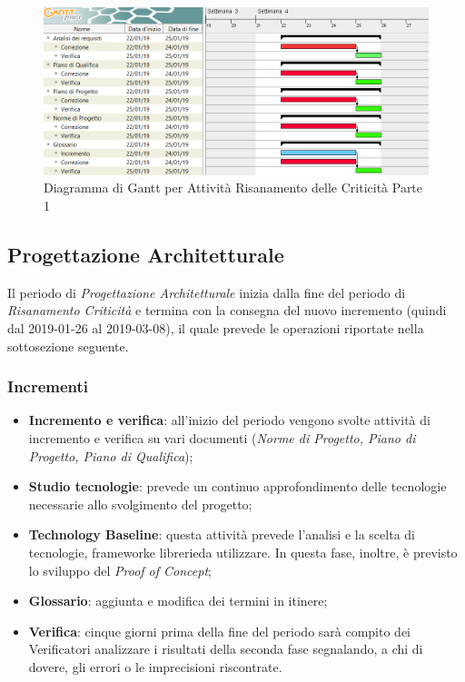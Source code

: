 \begin{figure}[h]
	\centering
  		\includegraphics[width=1.0\linewidth]{./images/RisanamentoCriticita1.png}
  		\caption{Diagramma di Gantt per Attività Risanamento delle Criticità Parte 1}
  		\label{fig:Gantt Risananmento Criticità 1}
\end{figure}

\newpage
\subsection{Progettazione Architetturale}
\label{PA}

Il periodo di \textit{Progettazione Architetturale} inizia dalla fine del periodo di \textit{Risanamento Criticità} e termina con la consegna del nuovo incremento (quindi dal 2019-01-26 al 2019-03-08), il quale prevede le operazioni riportate nella sottosezione seguente.

\subsubsection{Incrementi}
\begin{itemize}
	\item \textbf{Incremento e verifica}: all'inizio del periodo vengono svolte attività di incremento e verifica su vari documenti (\textit{Norme di Progetto, Piano di Progetto, Piano di Qualifica});
	\item \textbf{Studio tecnologie}: prevede un continuo approfondimento delle tecnologie necessarie allo svolgimento del progetto; 
	\item \textbf{Technology Baseline}\glossario: questa attività prevede l'analisi e la scelta di tecnologie, framework\glossario e librerie\glossario da utilizzare. In questa fase, inoltre, è previsto lo sviluppo del \textit{Proof of Concept}\glossario;
	\item \textbf{Glossario}: aggiunta e modifica dei termini in itinere;  
	\item \textbf{Verifica}: cinque giorni prima della fine del periodo sarà compito dei Verificatori analizzare i risultati della seconda fase segnalando, a chi di dovere, gli errori o le imprecisioni riscontrate.
\end{itemize}

